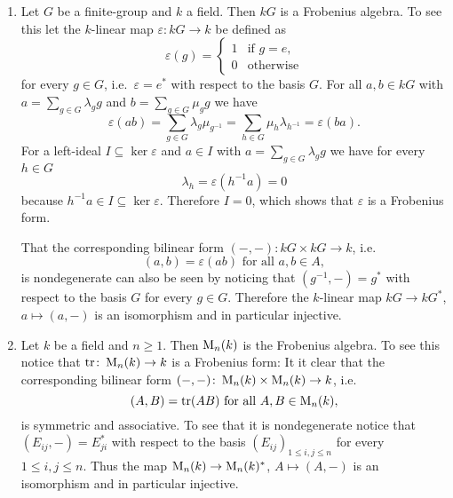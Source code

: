 \begin{expls}
  \begin{enumerate}[label=\emph{\alph*)},leftmargin=*]
    \item
      Let $G$ be a finite-group and $k$ a field.
      Then $kG$ is a Frobenius algebra.
      To see this let the $k$-linear map $\varepsilon \colon kG \to k$ be defined as
      \[
          \varepsilon(g)
        = \begin{cases}
            1 & \text{if } g = e, \\
            0 & \text{otherwise}
          \end{cases}
      \]
      for every $g \in G$, i.e.\ $\varepsilon = e^*$ with respect to the basis $G$.
      For all $a, b \in kG$ with $a = \sum_{g \in G} \lambda_g g$ and $b = \sum_{g \in G} \mu_g g$ we have
      \[
          \varepsilon(ab)
        = \sum_{g \in G} \lambda_g \mu_{g^{-1}}
        = \sum_{h \in G} \mu_h \lambda_{h^{-1}}
        = \varepsilon(ba).
      \]
      For a left-ideal $I \subseteq \ker \varepsilon$ and $a \in I $ with $a = \sum_{g \in G} \lambda_g g$ we have for every $h \in G$
      \[
          \lambda_h
        = \varepsilon\left( h^{-1} a \right)
        = 0
      \]
      because $h^{-1} a \in I \subseteq \ker \varepsilon$.
      Therefore $I = 0$, which shows that $\varepsilon$ is a Frobenius form.
      
      That the corresponding bilinear form $(-,-) \colon kG \times kG \to k$, i.e.\
      \[
          (a,b)
        = \varepsilon(ab)
        \text{ for all }
        a, b \in A,
      \]
      is nondegenerate can also be seen by noticing that $(g^{-1},-) = g^*$ with respect to the basis $G$ for every $g \in G$.
      Therefore the $k$-linear map $kG \to kG^*$, $a \mapsto (a,-)$ is an isomorphism and in particular injective.
    \item
      Let $k$ be a field and $n \geq 1$.
      Then $\operatorname{M}_n(k)$ is the Frobenius algebra.
      To see this notice that $\operatorname{tr} \colon \operatorname{M}_n(k) \to k$ is a Frobenius form:
      It it clear that the corresponding bilinear form $(-,-) \colon \operatorname{M}_n(k) \times \operatorname{M}_n(k) \to k$, i.e.\
      \[
          (A,B)
        = \operatorname{tr}(AB)
        \text{ for all }
        A, B \in \operatorname{M}_n(k),
      \]
      is symmetric and associative.
      To see that it is nondegenerate notice that $(E_{ij}, -) = E_{ji}^*$ with respect to the basis $(E_{ij})_{1 \leq i,j \leq n}$ for every $1 \leq i,j \leq n$.
      Thus the map $\operatorname{M}_n(k) \to \operatorname{M}_n(k)^*$, $A \mapsto (A,-)$ is an isomorphism and in particular injective.
  \end{enumerate}
\end{expls}


